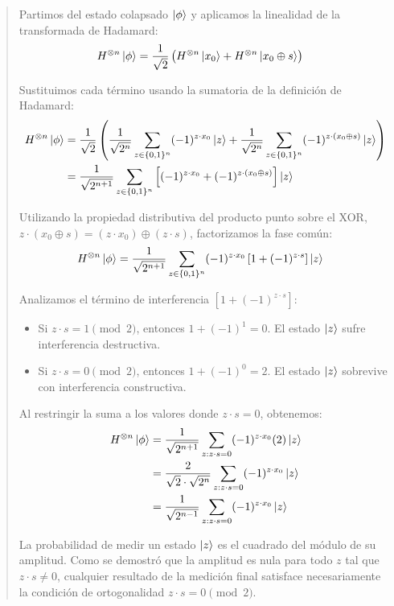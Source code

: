 \begin{quote}
            Partimos del estado colapsado $\ket{\phi}$ y aplicamos la linealidad de la transformada de Hadamard:
            \begin{align*}
                H^{\otimes n} \ket{\phi} &= \frac{1}{\sqrt{2}} \left( H^{\otimes n}\ket{x_0} + H^{\otimes n}\ket{x_0 \oplus s} \right)
            \end{align*}

            Sustituimos cada término usando la sumatoria de la definición de Hadamard:
            \begin{align*}
                H^{\otimes n} \ket{\phi} &= \frac{1}{\sqrt{2}} \left( \frac{1}{\sqrt{2^n}} \sum_{z \in \{0,1\}^n} (-1)^{z \cdot x_0} \ket{z} + \frac{1}{\sqrt{2^n}} \sum_{z \in \{0,1\}^n} (-1)^{z \cdot (x_0 \oplus s)} \ket{z} \right) \\
                &= \frac{1}{\sqrt{2^{n+1}}} \sum_{z \in \{0,1\}^n} \left[ (-1)^{z \cdot x_0} + (-1)^{z \cdot (x_0 \oplus s)} \right] \ket{z}
            \end{align*}

            Utilizando la propiedad distributiva del producto punto sobre el XOR, $z \cdot (x_0 \oplus s) = (z \cdot x_0) \oplus (z \cdot s)$, factorizamos la fase común:
            \begin{align*}
                H^{\otimes n} \ket{\phi} &= \frac{1}{\sqrt{2^{n+1}}} \sum_{z \in \{0,1\}^n} (-1)^{z \cdot x_0} \left[ 1 + (-1)^{z \cdot s} \right] \ket{z}
            \end{align*}

            Analizamos el término de interferencia $\left[ 1 + (-1)^{z \cdot s} \right]$:
            \begin{itemize}
                \item Si $z \cdot s = 1 \pmod 2$, entonces $1 + (-1)^1 = 0$. El estado $\ket{z}$ sufre interferencia destructiva.
                \item Si $z \cdot s = 0 \pmod 2$, entonces $1 + (-1)^0 = 2$. El estado $\ket{z}$ sobrevive con interferencia constructiva.
            \end{itemize}

            Al restringir la suma a los valores donde $z \cdot s = 0$, obtenemos:
            \begin{align*}
                H^{\otimes n} \ket{\phi} &= \frac{1}{\sqrt{2^{n+1}}} \sum_{z:z\cdot s=0} (-1)^{z \cdot x_0} (2) \ket{z} \\
                &= \frac{2}{\sqrt{2} \cdot \sqrt{2^n}} \sum_{z:z\cdot s=0} (-1)^{z \cdot x_0} \ket{z} \\
                &= \frac{1}{\sqrt{2^{n-1}}} \sum_{z:z\cdot s=0} (-1)^{z \cdot x_0} \ket{z}
            \end{align*}

            La probabilidad de medir un estado $\ket{z}$ es el cuadrado del módulo de su amplitud. Como se demostró que la amplitud es nula para todo $z$ tal que $z \cdot s \neq 0$, cualquier resultado de la medición final satisface necesariamente la condición de ortogonalidad $z \cdot s = 0 \pmod 2$.
\end{quote}

\vspace{.5cm}
